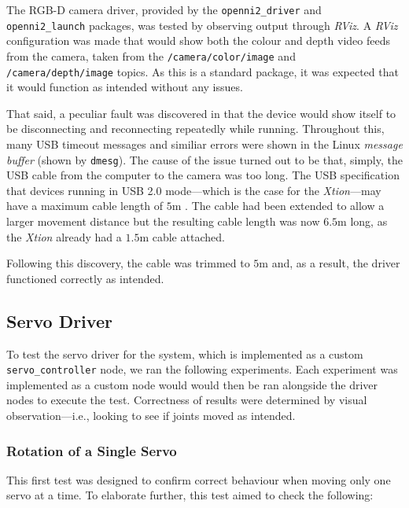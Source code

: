 The RGB-D camera driver, provided by the \texttt{openni2\_driver} and \texttt{openni2\_launch} packages, was tested by observing output through \emph{RViz}. A \emph{RViz} configuration was made that would show both the colour and depth video feeds from the camera, taken from the \texttt{/camera/color/image} and \texttt{/camera/depth/image} topics. As this is a standard package, it was expected that it would function as intended without any issues.

That said, a peculiar fault was discovered in that the device would show itself to be disconnecting and reconnecting repeatedly while running. Throughout this, many USB timeout messages and similiar errors were shown in the Linux \emph{message buffer} (shown by \texttt{dmesg}). The cause of the issue turned out to be that, simply, the USB cable from the computer to the camera was too long. The USB specification that devices running in USB 2.0 mode---which is the case for the \emph{Xtion}---may have a maximum cable length of $5$m \cite{usb_spec}. The cable had been extended to allow a larger movement distance but the resulting cable length was now $6.5$m long, as the \emph{Xtion} already had a $1.5$m cable attached.

Following this discovery, the cable was trimmed to $5$m and, as a result, the driver functioned correctly as intended.

\subsection{Servo Driver}

To test the servo driver for the system, which is implemented as a custom \texttt{servo\_controller} node, we ran the following experiments. Each experiment was implemented as a custom node would would then be ran alongside the driver nodes to execute the test. Correctness of results were determined by visual observation---i.e., looking to see if joints moved as intended. 

\subsubsection{Rotation of a Single Servo}

This first test was designed to confirm correct behaviour when moving only one servo at a time. To elaborate further, this test aimed to check the following:


